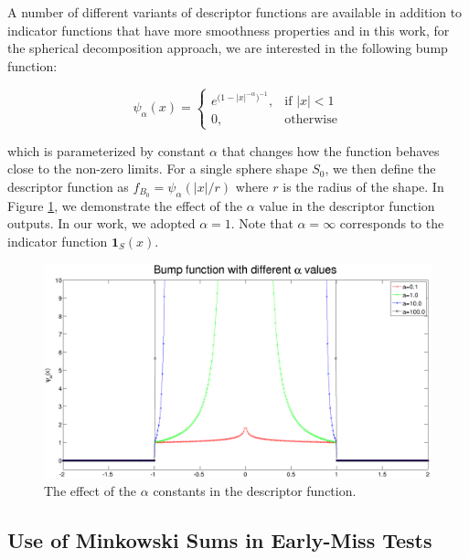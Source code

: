 \documentclass[letterpaper, 10 pt, conference]{ieeeconf}
\begin{document}
A number of different variants of descriptor functions are available in addition
to indicator functions that have more smoothness properties and in this work,
for the spherical decomposition approach, we are interested in the following
bump function:

\begin{equation}
 \psi_\alpha(x) = 
 \begin{cases}
    e^{{(1-|x|^{-\alpha}})^{-1}},& \text{if } |x| < 1\\
    0,              & \text{otherwise}
\end{cases}
\end{equation}

\noindent which is parameterized by constant $\alpha$ that changes how
the function behaves close to the non-zero limits. For a single sphere shape $S_0$,
we then define the descriptor function as $f_{B_0} = \psi_\alpha(|x|/r)$ where
$r$ is the radius of the shape. In Figure \ref{fig:bumpAlphas}, we demonstrate
the effect of the $\alpha$ value in the descriptor function outputs. In our 
work, we adopted $\alpha = 1$. Note that $\alpha = \infty$ corresponds to the
indicator function $\mathbf{1}_S(x)$. 

\begin{figure}[ht!] 
  \centering
  \includegraphics[width=1.0\linewidth]{Figures/bump.png}
  \caption{The effect of the $\alpha$ constants in the descriptor function.}
  \label{fig:bumpAlphas}
\end{figure}

\subsection{Use of Minkowski Sums in Early-Miss Tests}
\end{document}
